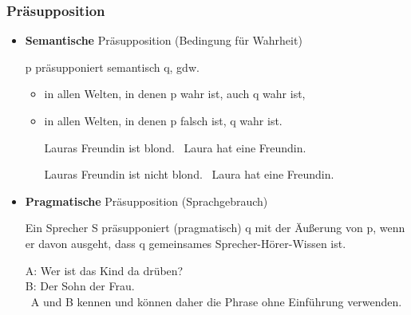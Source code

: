 
\begin{frame}
\frametitle{Präsupposition}

\begin{itemize}
	\item \textbf{Semantische} Präsupposition  (Bedingung für Wahrheit)
		
		p präsupponiert semantisch q, gdw.

		\begin{itemize}
			\item in allen Welten, in denen p wahr ist, auch q wahr ist,
			\item in allen Welten, in denen p falsch ist, q wahr ist.
			
			\ea Lauras Freundin ist blond. \hfill 
			\prspp\ Laura hat eine Freundin.
			\z
			
			\ea Lauras Freundin ist nicht blond. \hfill 
			\prspp\ Laura hat eine Freundin.
			\z
			
		\end{itemize}
	
	\item \textbf{Pragmatische} Präsupposition (Sprachgebrauch)

		Ein Sprecher S präsupponiert (pragmatisch) q mit der Äu\ss{}erung von p, wenn er davon ausgeht, dass q gemeinsames Sprecher-Hörer-Wissen ist.
			
		\ea A: Wer ist das Kind da drüben? \\
			   B: Der Sohn der Frau. \\
			   \ent\ A und B kennen  und können daher die Phrase ohne Einführung verwenden.
		\z
	
\end{itemize}

\end{frame}



